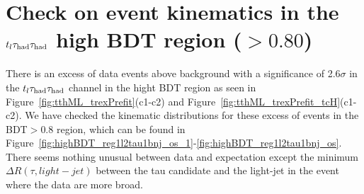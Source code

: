 \section{Check on event kinematics in the $t_l\tau_\text{had}{}\tau_\text{had}$ high BDT region ($>0.80$)}
\label{sec:checkexcess}

There is an excess of data events above background with a significance of 2.6$\sigma$ in the $t_l\tau_\text{had}{}\tau_\text{had}$ channel in the hight BDT region as seen in Figure~\ref{fig:tthML_trexPrefit}(c1-c2) and Figure~\ref{fig:tthML_trexPrefit_tcH}(c1-c2). We have checked the kinematic distributions for these excess of events in
the BDT$>0.8$ region, which can be found in Figure~\ref{fig:highBDT_reg1l2tau1bnj_os_1}-\ref{fig:highBDT_reg1l2tau1bnj_os}.
There seems nothing unusual between data and expectation except the minimum $\Delta R(\tau, light-jet)$ between the
tau candidate and the light-jet in the event where the data are more broad.


